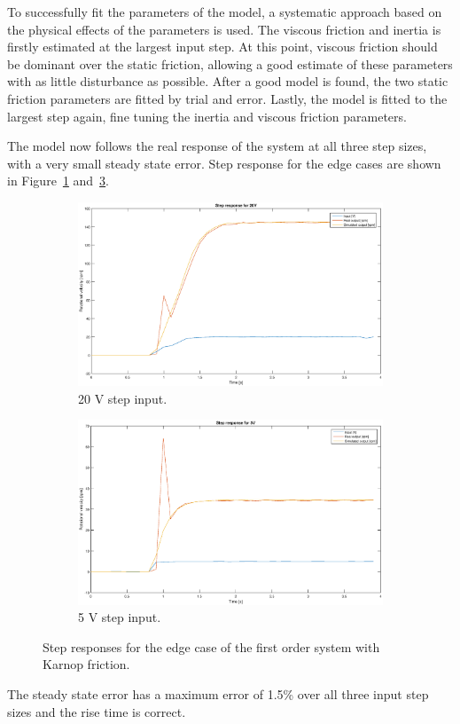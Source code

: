 To successfully fit the parameters of the model, a systematic approach based on
the physical effects of the parameters is used. The viscous friction and inertia 
is firstly estimated at the largest input step. At this point, viscous friction
should be dominant over the static friction, allowing a good estimate of these
parameters with as little disturbance as possible. After a good model is found,
the two static friction parameters are fitted by trial and error. Lastly, the
model is fitted to the largest step again, fine tuning the inertia and viscous
friction parameters.

The model now follows the real response of the system at all three step sizes,
with a very small steady state error. Step response for the edge cases are shown
in Figure~\ref{fig:20vkarnop} and~\ref{fig:5vkarnop}.
\begin{figure}[H]
    \centering
    \begin{subfigure}[H]{0.48\textwidth}
    \includegraphics[width=\textwidth]{./img/testrig_20Vstep_no_i_fric.eps}
    \caption{20 V step input.}\label{fig:20vkarnop}
    \end{subfigure}
    \begin{subfigure}[H]{0.48\textwidth}
    \includegraphics[width=\textwidth]{./img/testrig_5Vstep_no_i_fric.eps}
    \caption{5 V step input.}\label{fig:5vkarnop}
    \end{subfigure}
    \caption{Step responses for the edge case of the first order system with
    Karnop friction.}
\end{figure}
The steady state error has a maximum error of 1.5\% over all three input step
sizes and the rise time is correct. %


